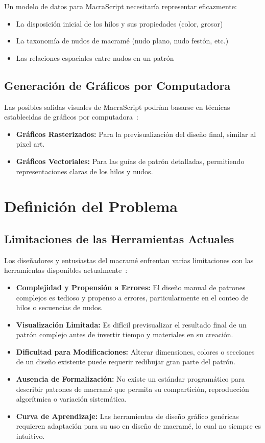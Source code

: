 \documentclass[conference]{IEEEtran}
\begin{document}
Un modelo de datos para MacraScript necesitaría representar eficazmente:

\begin{itemize}
    \item La disposición inicial de los hilos y sus propiedades (color, grosor)
    \item La taxonomía de nudos de macramé (nudo plano, nudo festón, etc.)
    \item Las relaciones espaciales entre nudos en un patrón~\cite{hashemi2017}
\end{itemize}

\subsection{Generación de Gráficos por Computadora}
Las posibles salidas visuales de MacraScript podrían basarse en técnicas establecidas de gráficos por computadora~\cite{hudson2018}:

\begin{itemize}
    \item \textbf{Gráficos Rasterizados:} Para la previsualización del diseño final, similar al pixel art.
    \item \textbf{Gráficos Vectoriales:} Para las guías de patrón detalladas, permitiendo representaciones claras de los hilos y nudos.
\end{itemize}

\section{Definición del Problema}
\subsection{Limitaciones de las Herramientas Actuales}
Los diseñadores y entusiastas del macramé enfrentan varias limitaciones con las herramientas disponibles actualmente~\cite{owen1997}:

\begin{itemize}
    \item \textbf{Complejidad y Propensión a Errores:} El diseño manual de patrones complejos es tedioso y propenso a errores, particularmente en el conteo de hilos o secuencias de nudos.
    \item \textbf{Visualización Limitada:} Es difícil previsualizar el resultado final de un patrón complejo antes de invertir tiempo y materiales en su creación.
    \item \textbf{Dificultad para Modificaciones:} Alterar dimensiones, colores o secciones de un diseño existente puede requerir redibujar gran parte del patrón.
    \item \textbf{Ausencia de Formalización:} No existe un estándar programático para describir patrones de macramé que permita su compartición, reproducción algorítmica o variación sistemática.
    \item \textbf{Curva de Aprendizaje:} Las herramientas de diseño gráfico genéricas requieren adaptación para su uso en diseño de macramé, lo cual no siempre es intuitivo.
\end{itemize}
\end{document}
